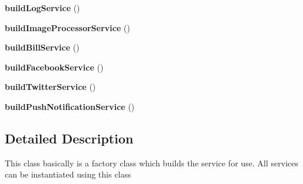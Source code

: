 \begin{DoxyCompactItemize}
\item 
\hypertarget{class_test_a11c19b44882c3947d2f0eb51a860e6eb}{{\bfseries build\+Log\+Service} ()}\label{class_test_a11c19b44882c3947d2f0eb51a860e6eb}

\item 
\hypertarget{class_test_a8340ed9d8b899b18720c0daae10ac7db}{{\bfseries build\+Image\+Processor\+Service} ()}\label{class_test_a8340ed9d8b899b18720c0daae10ac7db}

\item 
\hypertarget{class_test_a425464b062a83c60ddcd1f7bfeff8c56}{{\bfseries build\+Bill\+Service} ()}\label{class_test_a425464b062a83c60ddcd1f7bfeff8c56}

\item 
\hypertarget{class_test_ac4febb614964d21a63a52692fe54e80b}{{\bfseries build\+Facebook\+Service} ()}\label{class_test_ac4febb614964d21a63a52692fe54e80b}

\item 
\hypertarget{class_test_a21b99cdf7e12eb0a4e55c59fdde21522}{{\bfseries build\+Twitter\+Service} ()}\label{class_test_a21b99cdf7e12eb0a4e55c59fdde21522}

\item 
\hypertarget{class_test_ab0681a8362956e9b68d91d162af5fabd}{{\bfseries build\+Push\+Notification\+Service} ()}\label{class_test_ab0681a8362956e9b68d91d162af5fabd}

\end{DoxyCompactItemize}


\subsection{Detailed Description}
This class basically is a factory class which builds the service for use. All services can be instantiated using this class 